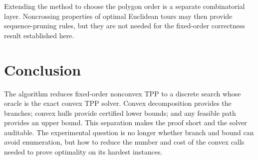 \documentclass[11pt]{article}
\begin{document}
Extending the method to choose the polygon order is a separate combinatorial
layer. Noncrossing properties of optimal Euclidean tours may then provide
sequence-pruning rules, but they are not needed for the fixed-order correctness
result established here.

\section{Conclusion}

The algorithm reduces fixed-order nonconvex TPP to a discrete search whose
oracle is the exact convex TPP solver. Convex decomposition provides the
branches; convex hulls provide certified lower bounds; and any feasible path
provides an upper bound. This separation makes the proof short and the solver
auditable. The experimental question is no longer whether branch and bound can
avoid enumeration, but how to reduce the number and cost of the convex calls
needed to prove optimality on its hardest instances.
\end{document}
